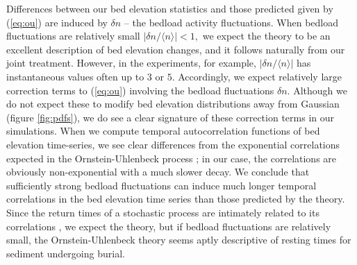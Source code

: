 \documentclass[draft]{agujournal2018}
\newcommand\bra{\langle}
\newcommand\ket{\rangle}
\begin{document}
Differences between our bed elevation statistics and those predicted \citet{Martin2014} given by (\ref{eq:ou}) are induced by $\delta n$ -- the bedload activity fluctuations.
When bedload fluctuations are relatively small $|\delta n/\bra n \ket|<1,$ we expect the \citet{Martin2014} theory to be an excellent description of bed elevation changes, and it follows naturally from our joint treatment.
However, in the \citet{Ancey2008} experiments, for example, $|\delta n/\bra n \ket|$ has instantaneous values often up to $3$ or $5$.
Accordingly, we expect relatively large correction terms to (\ref{eq:ou}) involving the bedload fluctuations $\delta n$.
Although we do not expect these to modify bed elevation distributions away from Gaussian (figure \ref{fig:pdfs}), we do see a clear signature of these correction terms in our simulations.
When we compute temporal autocorrelation functions of bed elevation time-series, we see clear differences from the exponential correlations expected in the Ornstein-Uhlenbeck process \citep[e.g.][]{Horsthemke1984,Risken1989}; in our case, the correlations are obviously non-exponential with a much slower decay.
We conclude that sufficiently strong bedload fluctuations can induce much longer temporal correlations in the bed elevation time series than those predicted by the \citet{Martin2014} theory.
Since the return times of a stochastic process are intimately related to its correlations \citep[e.g.][]{Redner2007}, we expect the \citet{Martin2014} theory, but if bedload fluctuations are relatively small, the Ornstein-Uhlenbeck theory seems aptly descriptive of resting times for sediment undergoing burial.
\end{document}
